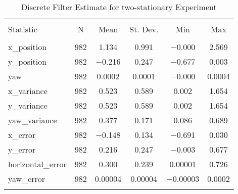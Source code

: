 
\begin{table}[h] \centering 
  \caption{Discrete Filter Estimate for two-stationary Experiment} 
  \label{tab:two_stationary_discrete_summary} 
\begin{tabular}{@{\extracolsep{5pt}}lccccc} 
\\[-1.8ex]\hline 
\hline \\[-1.8ex] 
Statistic & \multicolumn{1}{c}{N} & \multicolumn{1}{c}{Mean} & \multicolumn{1}{c}{St. Dev.} & \multicolumn{1}{c}{Min} & \multicolumn{1}{c}{Max} \\ 
\hline \\[-1.8ex] 
x\_position & 982 & 1.134 & 0.991 & $-$0.000 & 2.569 \\ 
y\_position & 982 & $-$0.216 & 0.247 & $-$0.677 & 0.003 \\ 
yaw & 982 & 0.0002 & 0.0001 & $-$0.000 & 0.0004 \\ 
x\_variance & 982 & 0.523 & 0.589 & 0.002 & 1.654 \\ 
y\_variance & 982 & 0.523 & 0.589 & 0.002 & 1.654 \\ 
yaw\_variance & 982 & 0.377 & 0.171 & 0.086 & 0.689 \\ 
x\_error & 982 & $-$0.148 & 0.134 & $-$0.691 & 0.030 \\ 
y\_error & 982 & 0.216 & 0.247 & $-$0.003 & 0.677 \\ 
horizontal\_error & 982 & 0.300 & 0.239 & 0.00001 & 0.726 \\ 
yaw\_error & 982 & 0.00004 & 0.00004 & $-$0.00003 & 0.0002 \\ 
\hline \\[-1.8ex] 
\end{tabular} 
\end{table} 
